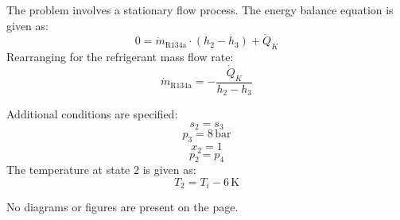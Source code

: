 The problem involves a stationary flow process. The energy balance equation is given as:  
\[
0 = \dot{m}_{\text{R134a}} \cdot (h_2 - h_3) + \dot{Q}_K
\]  
Rearranging for the refrigerant mass flow rate:  
\[
\dot{m}_{\text{R134a}} = -\frac{\dot{Q}_K}{h_2 - h_3}
\]  

Additional conditions are specified:  
\[
s_2 = s_3
\]  
\[
p_3 = 8 \, \text{bar}
\]  
\[
x_2 = 1
\]  
\[
p_2 = p_4
\]  
The temperature at state 2 is given as:  
\[
T_2 = T_i - 6 \, \text{K}
\]  

No diagrams or figures are present on the page.